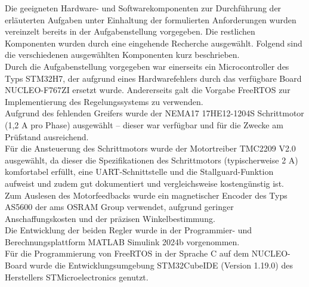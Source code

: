 Die geeigneten Hardware- und Softwarekomponenten zur Durchführung der erläuterten Aufgaben unter Einhaltung der formulierten Anforderungen wurden vereinzelt bereits in der Aufgabenstellung vorgegeben. Die restlichen Komponenten wurden durch eine eingehende Recherche ausgewählt. Folgend sind die verschiedenen ausgewählten Komponenten kurz beschrieben.\\

Durch die Aufgabenstellung vorgegeben war einerseits ein Microcontroller des Typs STM32H7, der aufgrund eines Hardwarefehlers durch das verfügbare Board NUCLEO-F767ZI ersetzt wurde. Andererseits galt die Vorgabe FreeRTOS zur Implementierung des Regelungssystems zu verwenden.\\

Aufgrund des fehlenden Greifers wurde der NEMA17 17HE12-1204S Schrittmotor (1,2 A pro Phase) ausgewählt – dieser war verfügbar und für die Zwecke am Prüfstand ausreichend.\\

Für die Ansteuerung des Schrittmotors wurde der Motortreiber TMC2209 V2.0 ausgewählt, da dieser die Spezifikationen des Schrittmotors (typischerweise 2 A) komfortabel erfüllt, eine UART-Schnittstelle und die Stallguard-Funktion aufweist und zudem gut dokumentiert und vergleichsweise kostengünstig ist.\\

Zum Auslesen des Motorfeedbacks wurde ein magnetischer Encoder des Typs AS5600 der ams OSRAM Group verwendet, aufgrund geringer Anschaffungskosten und der präzisen Winkelbestimmung.\\

Die Entwicklung der beiden Regler wurde in der Programmier- und Berechnungsplattform MATLAB Simulink 2024b vorgenommen.\\

Für die Programmierung von FreeRTOS in der Sprache C auf dem NUCLEO-Board wurde die Entwicklungsumgebung STM32CubeIDE (Version 1.19.0) des Herstellers STMicroelectronics genutzt.
